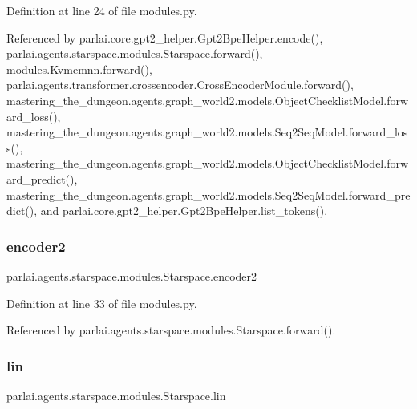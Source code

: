 Definition at line 24 of file modules.\+py.



Referenced by parlai.\+core.\+gpt2\+\_\+helper.\+Gpt2\+Bpe\+Helper.\+encode(), parlai.\+agents.\+starspace.\+modules.\+Starspace.\+forward(), modules.\+Kvmemnn.\+forward(), parlai.\+agents.\+transformer.\+crossencoder.\+Cross\+Encoder\+Module.\+forward(), mastering\+\_\+the\+\_\+dungeon.\+agents.\+graph\+\_\+world2.\+models.\+Object\+Checklist\+Model.\+forward\+\_\+loss(), mastering\+\_\+the\+\_\+dungeon.\+agents.\+graph\+\_\+world2.\+models.\+Seq2\+Seq\+Model.\+forward\+\_\+loss(), mastering\+\_\+the\+\_\+dungeon.\+agents.\+graph\+\_\+world2.\+models.\+Object\+Checklist\+Model.\+forward\+\_\+predict(), mastering\+\_\+the\+\_\+dungeon.\+agents.\+graph\+\_\+world2.\+models.\+Seq2\+Seq\+Model.\+forward\+\_\+predict(), and parlai.\+core.\+gpt2\+\_\+helper.\+Gpt2\+Bpe\+Helper.\+list\+\_\+tokens().

\mbox{\label{classparlai_1_1agents_1_1starspace_1_1modules_1_1Starspace_a7ead99b8e725174d82e97bd014bd26c9}} 
\subsubsection{\texorpdfstring{encoder2}{encoder2}}
{\footnotesize\ttfamily parlai.\+agents.\+starspace.\+modules.\+Starspace.\+encoder2}



Definition at line 33 of file modules.\+py.



Referenced by parlai.\+agents.\+starspace.\+modules.\+Starspace.\+forward().

\mbox{\label{classparlai_1_1agents_1_1starspace_1_1modules_1_1Starspace_ab8e5d5eaf9aba2d98fdcf56dd5bf986d}} 
\subsubsection{\texorpdfstring{lin}{lin}}
{\footnotesize\ttfamily parlai.\+agents.\+starspace.\+modules.\+Starspace.\+lin}



